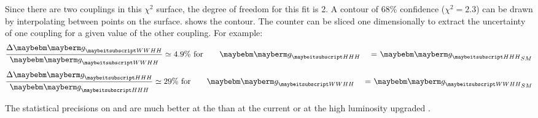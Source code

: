 Since there are two couplings in this $\chi^2$ surface, the degree of freedom for this fit is 2. A contour of 68\% confidence ($\chi^2 = 2.3$) can be drawn by interpolating between points on the surface.  shows the contour. The counter can be sliced one dimensionally to extract the uncertainty of one coupling for a given value of the other coupling. For example:
\begin{equation}
\frac{\Delta\gWWHH}{\gWWHH} \simeq 4.9\% \text{ for \gHHH = $\gHHH_{SM}$}
\end{equation}
\begin{equation}
\frac{\Delta\gHHH}{\gHHH} \simeq 29\% \text{ for \gWWHH = $\gWWHH_{SM}$}
\end{equation}

The statistical precisions on \gWWHH and \gHHH are much better at the \CLIC than at the current \LHC or at the high luminosity upgraded \LHC \cite{Contino:2010mh}.
